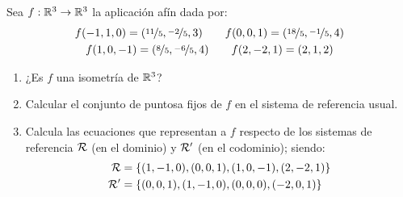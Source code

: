 \documentclass[12pt]{article}
\begin{document}
    \begin{ejercicio}
        Sea $f:\mathbb{R}^3\to \mathbb{R}^3$ la aplicación afín dada por:
        \begin{gather*}
            f(-1,1,0) = (\nicefrac{11}{5}, \nicefrac{-2}{5}, 3) \qquad
            f(0,0,1) = (\nicefrac{18}{5}, \nicefrac{-1}{5}, 4) \\
            f(1,0,-1) = (\nicefrac{8}{5}, \nicefrac{-6}{5}, 4) \qquad
            f(2,-2,1)=(2,1,2)
        \end{gather*}
        \begin{enumerate}
            \item ¿Es $f$ una isometría de $\mathbb{R}^3$?
            \item Calcular el conjunto de puntosa fijos de $f$ en el sistema de referencia usual.
            \item Calcula las ecuaciones que representan a $f$ respecto de los sistemas de referencia $\mathcal{R}$ (en el dominio) y $\mathcal{R}'$ (en el codominio); siendo:
            \begin{equation*}
                \begin{split}
                    \mathcal{R}&= \{(1,-1,0), (0,0,1), (1,0,-1), (2,-2,1)\} \\
                    \mathcal{R}'&= \{(0,0,1), (1,-1,0), (0,0,0), (-2,0,1)\} \\
                \end{split}
            \end{equation*}
        \end{enumerate}
    \end{ejercicio}   
\end{document}
